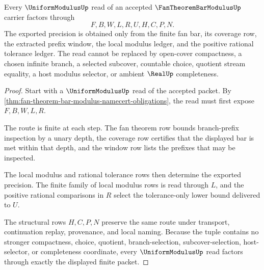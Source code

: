\begin{theorem}
\label{thm:fan-theorem-finite-bar-modulus-extraction}
Every $\UniformModulusUp$ read of an accepted $\FanTheoremBarModulusUp$ carrier factors through
$$
F,B,W,L,R,U,H,C,P,N .
$$
The exported precision is obtained only from the finite fan bar, its coverage row, the extracted prefix window, the local modulus ledger, and the positive rational tolerance ledger. The read cannot be replaced by open-cover compactness, a chosen infinite branch, a selected subcover, countable choice, quotient stream equality, a host modulus selector, or ambient $\RealUp$ completeness.
\end{theorem}
\begin{proof}
Start with a $\UniformModulusUp$ read of the accepted packet. By \autoref{thm:fan-theorem-bar-modulus-namecert-obligations}, the read must first expose $F,B,W,L,R$.

The route is finite at each step. The fan theorem row bounds branch-prefix inspection by a unary depth, the coverage row certifies that the displayed bar is met within that depth, and the window row lists the prefixes that may be inspected.

The local modulus and rational tolerance rows then determine the exported precision. The finite family of local modulus rows is read through $L$, and the positive rational comparisons in $R$ select the tolerance-only lower bound delivered to $U$.

The structural rows $H,C,P,N$ preserve the same route under transport, continuation replay, provenance, and local naming. Because the tuple contains no stronger compactness, choice, quotient, branch-selection, subcover-selection, host-selector, or completeness coordinate, every $\UniformModulusUp$ read factors through exactly the displayed finite packet.
\end{proof}



